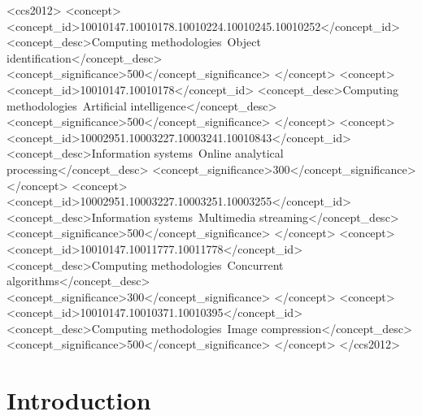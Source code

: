 \documentclass[sigconf, screen, review, anonymous]{acmart}
\begin{document}
\begin{CCSXML}
<ccs2012>
   <concept>
       <concept_id>10010147.10010178.10010224.10010245.10010252</concept_id>
       <concept_desc>Computing methodologies~Object identification</concept_desc>
       <concept_significance>500</concept_significance>
       </concept>
   <concept>
       <concept_id>10010147.10010178</concept_id>
       <concept_desc>Computing methodologies~Artificial intelligence</concept_desc>
       <concept_significance>500</concept_significance>
       </concept>
   <concept>
       <concept_id>10002951.10003227.10003241.10010843</concept_id>
       <concept_desc>Information systems~Online analytical processing</concept_desc>
       <concept_significance>300</concept_significance>
       </concept>
   <concept>
       <concept_id>10002951.10003227.10003251.10003255</concept_id>
       <concept_desc>Information systems~Multimedia streaming</concept_desc>
       <concept_significance>500</concept_significance>
       </concept>
   <concept>
       <concept_id>10010147.10011777.10011778</concept_id>
       <concept_desc>Computing methodologies~Concurrent algorithms</concept_desc>
       <concept_significance>300</concept_significance>
       </concept>
   <concept>
       <concept_id>10010147.10010371.10010395</concept_id>
       <concept_desc>Computing methodologies~Image compression</concept_desc>
       <concept_significance>500</concept_significance>
       </concept>
 </ccs2012>
\end{CCSXML}




\maketitle

\newpage
\section{Introduction}
\label{sec:introduction}
\end{document}
